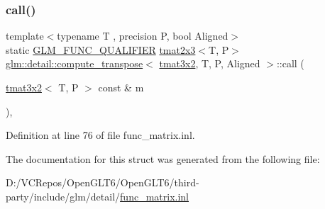 \subsubsection{\texorpdfstring{call()}{call()}}
{\footnotesize\ttfamily template$<$typename T , precision P, bool Aligned$>$ \\
static \mbox{\hyperlink{setup_8hpp_a33fdea6f91c5f834105f7415e2a64407}{G\+L\+M\+\_\+\+F\+U\+N\+C\+\_\+\+Q\+U\+A\+L\+I\+F\+I\+ER}} \mbox{\hyperlink{structglm_1_1tmat2x3}{tmat2x3}}$<$T, P$>$ \mbox{\hyperlink{structglm_1_1detail_1_1compute__transpose}{glm\+::detail\+::compute\+\_\+transpose}}$<$ \mbox{\hyperlink{structglm_1_1tmat3x2}{tmat3x2}}, T, P, Aligned $>$\+::call (\begin{DoxyParamCaption}\item[{\mbox{\hyperlink{structglm_1_1tmat3x2}{tmat3x2}}$<$ T, P $>$ const \&}]{m }\end{DoxyParamCaption})\hspace{0.3cm}{\ttfamily [inline]}, {\ttfamily [static]}}



Definition at line 76 of file func\+\_\+matrix.\+inl.



The documentation for this struct was generated from the following file\+:\begin{DoxyCompactItemize}
\item 
D\+:/\+V\+C\+Repos/\+Open\+G\+L\+T6/\+Open\+G\+L\+T6/third-\/party/include/glm/detail/\mbox{\hyperlink{func__matrix_8inl}{func\+\_\+matrix.\+inl}}\end{DoxyCompactItemize}
